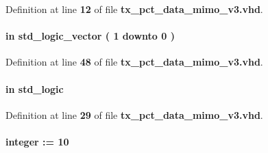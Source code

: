 Definition at line {\bf 12} of file {\bf tx\+\_\+pct\+\_\+data\+\_\+mimo\+\_\+v3.\+vhd}.

\paragraph[{ch\+\_\+en}]{ {\bfseries \textcolor{keywordflow}{in}\textcolor{vhdlchar}{ }} {\bfseries \textcolor{comment}{std\+\_\+logic\+\_\+vector}\textcolor{vhdlchar}{ }\textcolor{vhdlchar}{(}\textcolor{vhdlchar}{ }\textcolor{vhdlchar}{ } \textcolor{vhdldigit}{1} \textcolor{vhdlchar}{ }\textcolor{keywordflow}{downto}\textcolor{vhdlchar}{ }\textcolor{vhdlchar}{ } \textcolor{vhdldigit}{0} \textcolor{vhdlchar}{ }\textcolor{vhdlchar}{)}\textcolor{vhdlchar}{ }} \hspace{0.3cm}{\ttfamily [Port]}}\label{classtx__pct__data__mimo__v3_a6494f316f504075c4ccf47146756d576}


Definition at line {\bf 48} of file {\bf tx\+\_\+pct\+\_\+data\+\_\+mimo\+\_\+v3.\+vhd}.

\paragraph[{clk}]{ {\bfseries \textcolor{keywordflow}{in}\textcolor{vhdlchar}{ }} {\bfseries \textcolor{comment}{std\+\_\+logic}\textcolor{vhdlchar}{ }} \hspace{0.3cm}{\ttfamily [Port]}}\label{classtx__pct__data__mimo__v3_a4a4609c199d30b3adebbeb3a01276ec5}


Definition at line {\bf 29} of file {\bf tx\+\_\+pct\+\_\+data\+\_\+mimo\+\_\+v3.\+vhd}.

\paragraph[{dcmpr\+\_\+fifo}]{ {\bfseries \textcolor{vhdlchar}{ }} {\bfseries \textcolor{comment}{integer}\textcolor{vhdlchar}{ }\textcolor{vhdlchar}{ }\textcolor{vhdlchar}{\+:}\textcolor{vhdlchar}{=}\textcolor{vhdlchar}{ }\textcolor{vhdlchar}{ } \textcolor{vhdldigit}{10} \textcolor{vhdlchar}{ }} \hspace{0.3cm}{\ttfamily [Generic]}}\label{classtx__pct__data__mimo__v3_a062a01acbbf391bf6a576a9932262fb0}


